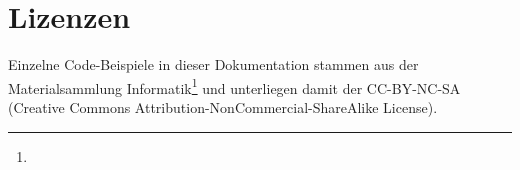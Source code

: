 \section{Lizenzen}
	\license

	Einzelne Code-Beispiele in dieser Dokumentation stammen aus der Materialsammlung Informatik\footnote{\materialsammlung} und unterliegen damit der CC-BY-NC-SA (Creative Commons Attribution-NonCommercial-ShareAlike License).